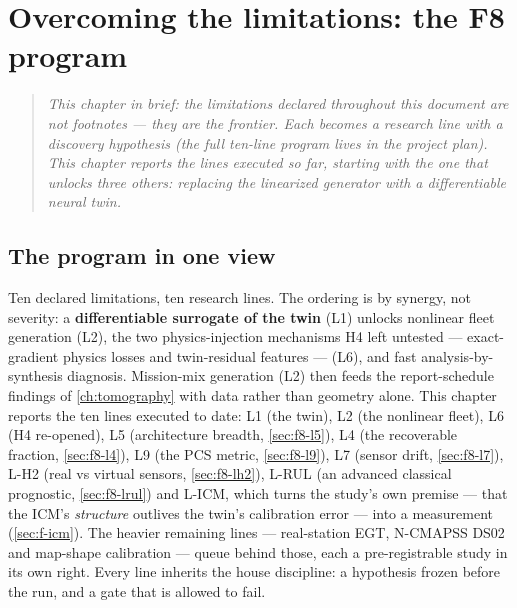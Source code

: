 \chapter{Overcoming the limitations: the F8 program}
\label{ch:overcoming}

\begin{quote}\itshape
This chapter in brief: the limitations declared throughout this document are not footnotes
--- they are the frontier. Each becomes a research line with a discovery hypothesis (the
full ten-line program lives in the project plan). This chapter reports the lines executed
so far, starting with the one that unlocks three others: replacing the linearized generator
with a differentiable neural twin.
\end{quote}



\section{The program in one view}
\label{sec:f8-program}

Ten declared limitations, ten research lines. The ordering is by synergy, not severity: a
\textbf{differentiable surrogate of the twin} (L1) unlocks nonlinear fleet generation (L2),
the two physics-injection mechanisms H4 left untested --- exact-gradient physics losses and
twin-residual features --- (L6), and fast analysis-by-synthesis diagnosis. Mission-mix
generation (L2) then feeds the report-schedule findings of \cref{ch:tomography} with data
rather than geometry alone. This chapter reports the ten lines executed to date: L1 (the twin), L2 (the nonlinear
fleet), L6 (H4 re-opened), L5 (architecture breadth, \cref{sec:f8-l5}), L4 (the recoverable
fraction, \cref{sec:f8-l4}), L9 (the PCS metric, \cref{sec:f8-l9}), L7 (sensor drift,
\cref{sec:f8-l7}), L-H2 (real vs virtual sensors, \cref{sec:f8-lh2}), L-RUL (an advanced
classical prognostic, \cref{sec:f8-lrul}) and L-ICM, which turns the study's own premise ---
that the ICM's \emph{structure} outlives the twin's calibration error --- into a measurement
(\cref{sec:f-icm}). The heavier remaining lines --- real-station
EGT, N-CMAPSS DS02 and map-shape calibration --- queue behind those, each a pre-registrable
study in its own right.
Every line inherits the house discipline: a hypothesis frozen before the run, and a gate that
is allowed to fail.

